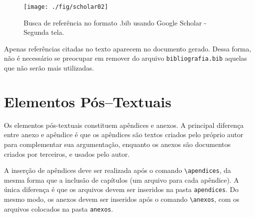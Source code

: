 \begin{figure}[H]
  \centering
  \texttt{[image: ./fig/scholar02]}
  \caption[Busca de referência - Segunda tela]{Busca de referência no formato .bib usando Google Scholar - Segunda tela.}
  \label{fig:scholar02}
\end{figure}

Apenas referências citadas no texto aparecem no documento gerado. Dessa forma, não é necessário se preocupar em remover do arquivo \verb|bibliografia.bib| aquelas que não serão mais utilizadas.

\section{Elementos Pós--Textuais}
\label{sec:pos}

Os elementos pós-textuais constituem apêndices e anexos. A principal diferença entre anexo e apêndice é que os apêndices são textos criados pelo próprio autor para complementar sua argumentação, enquanto os anexos são documentos criados por terceiros, e usados pelo autor. 

A inserção de apêndices deve ser realizada após o comando \verb|\apendices|, da mesma forma que a inclusão de capítulos (um arquivo para cada apêndice). A única diferença é que os arquivos devem ser inseridos na pasta \verb|apendices|. Do mesmo modo, os anexos devem ser inseridos após o comando \verb|\anexos|, com os arquivos colocados na pasta \verb|anexos|.